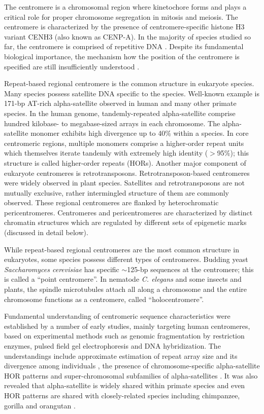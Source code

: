 The centromere is a chromosomal region where kinetochore forms and plays a critical role for proper chromosome segregation in mitosis and meiosis. The centromere is characterized by the presence of centromere-specific histone H3 variant CENH3 (also known as CENP-A). In the majority of species studied so far, the centromere is comprised of repetitive DNA \cite{Plohl2014}. Despite its fundamental biological importance, the mechanism how the position of the centromere is specified are still insufficiently understood \cite{McKinley2016}.

Repeat-based regional centromere is the common structure in eukaryote species. Many species possess satellite DNA specific to the species. Well-known example is 171-bp AT-rich alpha-satellite observed in human and many other primate species. In the human genome, tandemly-repeated alpha-satellite comprise hundred kilobase- to megabase-sized arrays in each chromosome. The alpha-satellite monomer exhibits high divergence up to 40\% within a species. In core centromeric regions, multiple monomers comprise a higher-order repeat units which themselves iterate tandemly with extremely high identity ($>$95\%); this structure is called higher-order repeats (HORs). Another major component of eukaryote centromeres is retrotransposons. Retrotransposon-based centromeres were widely observed in plant species. Satellites and retrotransposons are not mutually exclusive, rather intermingled structure of them are commonly observed. These regional centromeres are flanked by heterochromatic pericentromeres. Centromeres and pericentromeres are characterized by distinct chromatin structures which are regulated by different sets of epigenetic marks (discussed in detail below).

While repeat-based regional centromeres are the most common structure in eukaryotes, some species possess different types of centromeres. Budding yeast \textit{Saccharomyces cerevisiae} has specific $\sim$125-bp sequences at the centromere; this is called a ``point centromere''. In nematode \textit{C. elegans} and some insects and plants, the spindle microtubules attach all along a chromosome and the entire chromosome functions as a centromere, called ``holocentromere''.

Fundamental understanding of centromeric sequence characteristics were established by a number of early studies, mainly targeting human centromeres, based on experimental methods such as genomic fragmentation by restriction enzymes, pulsed field gel electrophoresis and DNA hybridization. The understandings include approximate estimation of repeat array size and its divergence among individuals \cite{Oakey1990}, the presence of chromosome-specific alpha-satellite HOR patterns \cite{Willard1987} and super-chromosomal subfamilies of alpha-satellites \cite{Alexandrov2001}. It was also revealed that alpha-satellite is widely shared within primate species and even HOR patterns are shared with closely-related species including chimpanzee, gorilla and orangutan \cite{Willard1991}.

